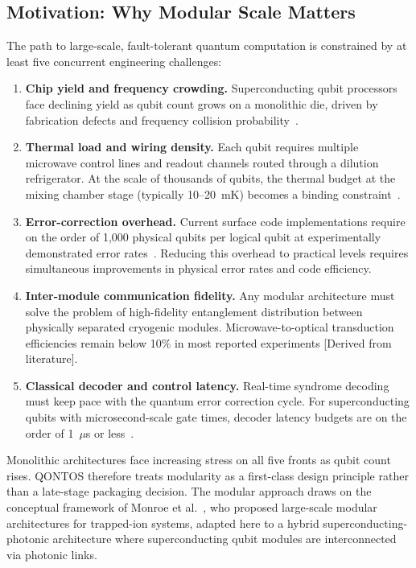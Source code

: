 \documentclass[conference]{IEEEtran}
\begin{document}
\subsection{Motivation: Why Modular Scale Matters}

The path to large-scale, fault-tolerant quantum computation is constrained by at least five concurrent engineering challenges:

\begin{enumerate}
\item \textbf{Chip yield and frequency crowding.} Superconducting qubit processors face declining yield as qubit count grows on a monolithic die, driven by fabrication defects and frequency collision probability~\cite{koch2007}.

\item \textbf{Thermal load and wiring density.} Each qubit requires multiple microwave control lines and readout channels routed through a dilution refrigerator. At the scale of thousands of qubits, the thermal budget at the mixing chamber stage (typically 10--20~mK) becomes a binding constraint~\cite{ibm2024}.

\item \textbf{Error-correction overhead.} Current surface code implementations require on the order of 1,000 physical qubits per logical qubit at experimentally demonstrated error rates~\cite{fowler2012}. Reducing this overhead to practical levels requires simultaneous improvements in physical error rates and code efficiency.

\item \textbf{Inter-module communication fidelity.} Any modular architecture must solve the problem of high-fidelity entanglement distribution between physically separated cryogenic modules. Microwave-to-optical transduction efficiencies remain below 10\% in most reported experiments [Derived from literature].

\item \textbf{Classical decoder and control latency.} Real-time syndrome decoding must keep pace with the quantum error correction cycle. For superconducting qubits with microsecond-scale gate times, decoder latency budgets are on the order of 1~$\mu$s or less~\cite{krinner2022}.
\end{enumerate}

Monolithic architectures face increasing stress on all five fronts as qubit count rises. QONTOS therefore treats modularity as a first-class design principle rather than a late-stage packaging decision. The modular approach draws on the conceptual framework of Monroe et al.~\cite{monroe2014}, who proposed large-scale modular architectures for trapped-ion systems, adapted here to a hybrid superconducting-photonic architecture where superconducting qubit modules are interconnected via photonic links.
\end{document}
